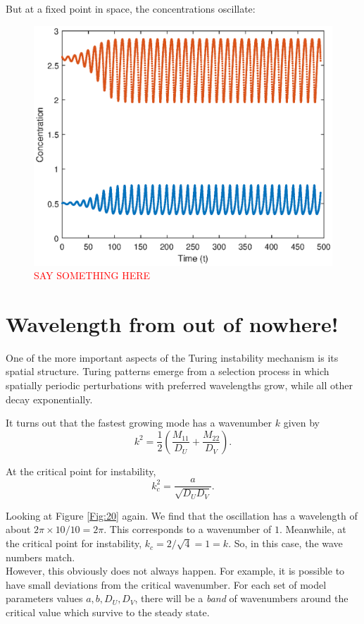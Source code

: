 \documentclass{book}
\theoremstyle{definition}
\newcommand{\f}[2]{\frac{#1}{#2}}
\newcommand{\lp}{\left(}
\newcommand{\rp}{\right)}
\begin{document}
But at a fixed point in space, the concentrations oscillate:
\begin{figure}[!htb]
	\centering
	\includegraphics[scale=0.6]{Turing_patterns/Turing_6.eps}
	\caption{\textcolor{red}{SAY SOMETHING HERE}}
	\label{Fig:24}
\end{figure}




\section{Wavelength from out of nowhere!}

One of the more important aspects of the Turing instability mechanism is its spatial structure. Turing patterns emerge from a selection process in which spatially
periodic perturbations with preferred wavelengths grow, while all other decay exponentially.


It turns out that the fastest growing mode has a wavenumber $k$ given by 
\begin{equation*}
k^2 = \f{1}{2}\lp \f{M_{11}}{D_U} + \f{M_{22}}{D_V} \rp.
\end{equation*}

At the critical point for instability, 
\begin{equation*}
k_c^2 = \f{a}{\sqrt{D_U D_V}}.
\end{equation*}



Looking at Figure \ref{Fig:20} again. We find that the oscillation has a wavelength of about $2\pi\times 10/10 = 2\pi$. This corresponds to a wavenumber of $1$. Meanwhile, at the critical point for instability, $k_c = 2/\sqrt{4} = 1 = k$. So, in this case, the wave numbers match. \\

However, this obviously does not always happen. For example, it is possible to have small deviations from the critical wavenumber. For each set of model parameters values $a,b,D_U, D_V$, there will be a \textit{band} of wavenumbers around the critical value which survive to the steady state. 
\end{document}
